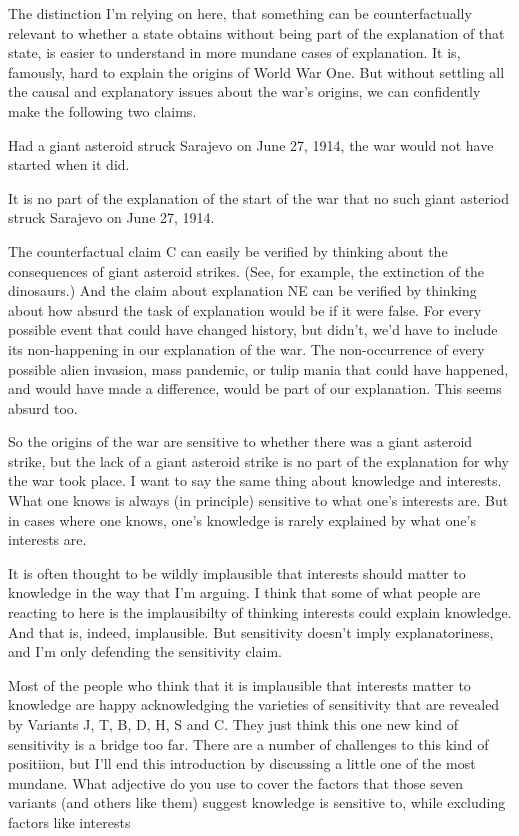 \documentclass[11pt,]{book}
\providecommand{\tightlist}{%
  \setlength{\itemsep}{0pt}\setlength{\parskip}{0pt}}
\begin{document}
The distinction I'm relying on here, that something can be counterfactually relevant to whether a state obtains without being part of the explanation of that state, is easier to understand in more mundane cases of explanation. It is, famously, hard to explain the origins of World War One. But without settling all the causal and explanatory issues about the war's origins, we can confidently make the following two claims.

\begin{description}
\tightlist
\item[C]
Had a giant asteroid struck Sarajevo on June 27, 1914, the war would not have started when it did.
\item[NE]
It is no part of the explanation of the start of the war that no such giant asteriod struck Sarajevo on June 27, 1914.
\end{description}

The counterfactual claim C can easily be verified by thinking about the consequences of giant asteroid strikes. (See, for example, the extinction of the dinosaurs.) And the claim about explanation NE can be verified by thinking about how absurd the task of explanation would be if it were false. For every possible event that could have changed history, but didn't, we'd have to include its non-happening in our explanation of the war. The non-occurrence of every possible alien invasion, mass pandemic, or tulip mania that could have happened, and would have made a difference, would be part of our explanation. This seems absurd too.

So the origins of the war are sensitive to whether there was a giant asteroid strike, but the lack of a giant asteroid strike is no part of the explanation for why the war took place. I want to say the same thing about knowledge and interests. What one knows is always (in principle) sensitive to what one's interests are. But in cases where one knows, one's knowledge is rarely explained by what one's interests are.

It is often thought to be wildly implausible that interests should matter to knowledge in the way that I'm arguing. I think that some of what people are reacting to here is the implausibilty of thinking interests could explain knowledge. And that is, indeed, implausible. But sensitivity doesn't imply explanatoriness, and I'm only defending the sensitivity claim.

Most of the people who think that it is implausible that interests matter to knowledge are happy acknowledging the varieties of sensitivity that are revealed by Variants J, T, B, D, H, S and C. They just think this one new kind of sensitivity is a bridge too far. There are a number of challenges to this kind of positiion, but I'll end this introduction by discussing a little one of the most mundane. What adjective do you use to cover the factors that those seven variants (and others like them) suggest knowledge is sensitive to, while excluding factors like interests
\end{document}
